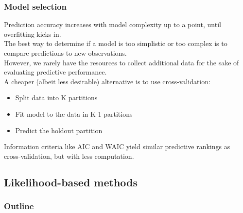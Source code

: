 \documentclass[color=usenames,dvipsnames]{beamer}\usepackage[]{graphicx}\usepackage[]{xcolor}
\begin{document}
\begin{frame}
  \frametitle{Model selection}
  Prediction accuracy increases with model complexity up to a point,
  until overfitting kicks in. \\
  \pause
  \vfill
  The best way to determine if a model is too simplistic or too
  complex is to compare predictions to new observations. \\
  \pause
  \vfill
  However, we rarely have the resources to
  collect additional data for the sake of evaluating predictive
  performance. \\ 
  \pause
  \vfill
  A cheaper (albeit less desirable) alternative is to use
  cross-validation: 
  \begin{itemize}
    \item Split data into K partitions
    \item Fit model to the data in K-1 partitions
    \item Predict the holdout partition
  \end{itemize}
  \pause
  \vfill
  Information criteria like AIC and WAIC yield similar predictive
  rankings as cross-validation, but with less computation.    
\end{frame}




\subsection{Likelihood-based methods}



\begin{frame}
  \frametitle{Outline}
  \Large
\end{frame}
\end{document}
